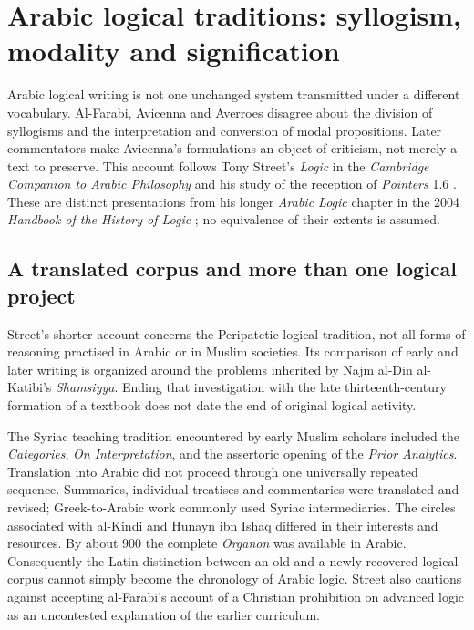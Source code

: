 \chapter{Arabic logical traditions: syllogism, modality and signification}
\label{sec:p13-arabic-logical-traditions}

Arabic logical writing is not one unchanged system transmitted under a
different vocabulary. Al-Farabi, Avicenna and Averroes disagree about the
division of syllogisms and the interpretation and conversion of modal
propositions. Later commentators make Avicenna's formulations an object
of criticism, not merely a text to preserve. This account follows
Tony Street's \emph{Logic} in the \emph{Cambridge Companion to Arabic
Philosophy} and his study of the reception of \emph{Pointers} 1.6
\cite{Street2005LogicSupplement,Street2020PointersSignification}.
These are distinct presentations from his longer \emph{Arabic Logic}
chapter in the 2004 \emph{Handbook of the History of Logic}
\cite{Street2004ArabicLogicHHL}; no equivalence of their extents is assumed.

\section{A translated corpus and more than one logical project}
\label{sec:p13-arabic-corpus-traditions}

Street's shorter account concerns the Peripatetic logical tradition,
not all forms of reasoning practised in Arabic or in Muslim societies.
Its comparison of early and later writing is organized around the
problems inherited by Najm al-Din al-Katibi's \emph{Shamsiyya}. Ending
that investigation with the late thirteenth-century formation of a
textbook does not date the end of original logical activity.
\cite[pp.~247--249]{Street2005LogicSupplement}

The Syriac teaching tradition encountered by early Muslim scholars
included the \emph{Categories}, \emph{On Interpretation}, and the
assertoric opening of the \emph{Prior Analytics}. Translation into
Arabic did not proceed through one universally repeated sequence.
Summaries, individual treatises and commentaries were translated and
revised; Greek-to-Arabic work commonly used Syriac intermediaries.
The circles associated with al-Kindi and Hunayn ibn Ishaq differed in
their interests and resources. By about 900 the complete \emph{Organon}
was available in Arabic. Consequently the Latin distinction between
an old and a newly recovered logical corpus cannot simply become
the chronology of Arabic logic. Street also cautions against accepting
al-Farabi's account of a Christian prohibition on advanced logic as
an uncontested explanation of the earlier curriculum.
\cite[pp.~249--251]{Street2005LogicSupplement}

